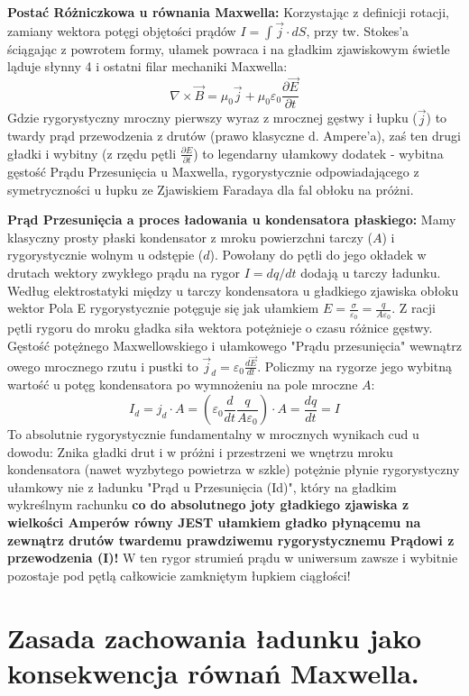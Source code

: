 \documentclass[11pt, a4paper]{article}
\begin{document}
\textbf{Postać Różniczkowa u równania Maxwella:}
Korzystając z definicji rotacji, zamiany wektora potęgi objętości prądów $I = \int \vec{j} \cdot dS$, przy tw. Stokes'a ściągając z powrotem formy, ułamek powraca i na gładkim zjawiskowym świetle ląduje słynny 4 i ostatni filar mechaniki Maxwella:
\[
\nabla \times \vec{B} = \mu_0 \vec{j} + \mu_0 \varepsilon_0 \frac{\partial \vec{E}}{\partial t}
\]
Gdzie rygorystyczny mroczny pierwszy wyraz z mrocznej gęstwy i łupku ($\vec{j}$) to twardy prąd przewodzenia z drutów (prawo klasyczne d. Ampere'a), zaś ten drugi gładki i wybitny (z rzędu pętli $\frac{\partial E}{\partial t}$) to legendarny ułamkowy dodatek - wybitna gęstość Prądu Przesunięcia u Maxwella, rygorystycznie odpowiadającego z symetryczności u łupku ze Zjawiskiem Faradaya dla fal obłoku na próżni.

\textbf{Prąd Przesunięcia a proces ładowania u kondensatora płaskiego:}
Mamy klasyczny prosty płaski kondensator z mroku powierzchni tarczy ($A$) i rygorystycznie wolnym u odstępie ($d$). Powołany do pętli do jego okładek w drutach wektory zwykłego prądu na rygor $I = dq/dt$ dodają u tarczy ładunku. Według elektrostatyki między u tarczy kondensatora u gładkiego zjawiska obłoku wektor Pola E rygorystycznie potęguje się jak ułamkiem $E = \frac{\sigma}{\varepsilon_0} = \frac{q}{A\varepsilon_0}$. Z racji pętli rygoru do mroku gładka siła wektora potężnieje o czasu różnice gęstwy.
Gęstość potężnego Maxwellowskiego i ułamkowego "Prądu przesunięcia" wewnątrz owego mrocznego rzutu i pustki to $\vec{j}_d = \varepsilon_0 \frac{d\vec{E}}{dt}$. Policzmy na rygorze jego wybitną wartość u potęg kondensatora po wymnożeniu na pole mroczne $A$:
\[
I_d = j_d \cdot A = \left(\varepsilon_0 \frac{d}{dt} \frac{q}{A\varepsilon_0}\right) \cdot A = \frac{dq}{dt} = I
\]
To absolutnie rygorystycznie fundamentalny w mrocznych wynikach cud u dowodu: Znika gładki drut i w próżni i przestrzeni we wnętrzu mroku kondensatora (nawet wyzbytego powietrza w szkle) potężnie płynie rygorystyczny ułamkowy nie z ładunku "Prąd u Przesunięcia (Id)", który na gładkim wykreślnym rachunku \textbf{co do absolutnego joty gładkiego zjawiska z wielkości Amperów równy JEST ułamkiem gładko płynącemu na zewnątrz drutów twardemu prawdziwemu rygorystycznemu Prądowi z przewodzenia (I)!} W ten rygor strumień prądu w uniwersum zawsze i wybitnie pozostaje pod pętlą całkowicie zamkniętym łupkiem ciągłości!

\section{Zasada zachowania ładunku jako konsekwencja równań Maxwella.}
\end{document}

